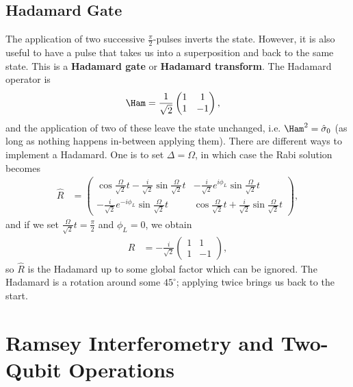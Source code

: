 \documentclass[a4paper, 11pt, normalem]{report}
\begin{document}
\section{Hadamard Gate}
The application of two successive $\frac{\pi}{2}$-pulses inverts the state.
However, it is also useful to have a pulse that takes us into a superposition and back to the same state.
This is a \textbf{Hadamard gate} or \textbf{Hadamard transform}.
The Hadamard operator is
\begin{align}
    \Ham &= \frac{1}{\sqrt{2}}\begin{pmatrix}1&1\\1&-1\end{pmatrix},
\end{align}
and the application of two of these leave the state unchanged, i.e. $\Ham^2 = \hat{\sigma}_0$ (as long as nothing happens in-between applying them).
There are different ways to implement a Hadamard.
One is to set $\Delta=\Omega$, in which case the Rabi solution becomes
\begin{align}
    \hat{R} &= \begin{pmatrix} \cos\frac{\Omega}{\sqrt{2}}t-\frac{i}{\sqrt{2}}\sin\frac{\Omega}{\sqrt{2}}t & -\frac{i}{\sqrt{2}}e^{i\phi_L}\sin\frac{\Omega}{\sqrt{2}}t \\  -\frac{i}{\sqrt{2}}e^{-i\phi_L}\sin\frac{\Omega}{\sqrt{2}}t & \cos\frac{\Omega}{\sqrt{2}}t+\frac{i}{\sqrt{2}}\sin\frac{\Omega}{\sqrt{2}}t \end{pmatrix},
\end{align}
and if we set $\frac{\Omega}{\sqrt{2}}t = \frac{\pi}{2}$ and $\phi_L=0$, we obtain
\begin{align}
    \hat{R} &= -\frac{i}{\sqrt{2}}\begin{pmatrix}1&1\\1&-1\end{pmatrix},
\end{align}
so $\hat{R}$ is the Hadamard up to some global factor which can be ignored.
The Hadamard is a rotation around some $45^\circ$; applying twice brings us back to the start.

\chapter{Ramsey Interferometry and Two-Qubit Operations}
\end{document}
